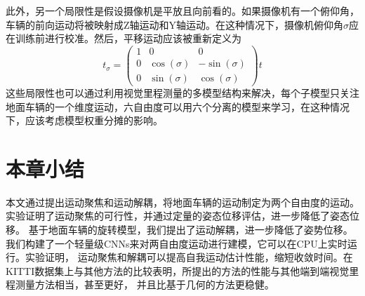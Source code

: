 此外，另一个局限性是假设摄像机是平放且向前看的。如果摄像机有一个俯仰角，车辆的前向运动将被映射成Z轴运动和Y轴运动。在这种情况下，摄像机俯仰角$\sigma$应在训练前进行校准。然后，平移运动应该被重新定义为
\begin{equation}
    t_\sigma = \begin{pmatrix} 1 & 0 & 0 \\ 0 & \cos(\sigma) & -\sin(\sigma)\\ 0 & \sin(\sigma) & \cos(\sigma) \end{pmatrix} t
    \label{eq:pitch_correction}
\end{equation}
这些局限性也可以通过利用视觉里程测量的多模型结构来解决，每个子模型只关注地面车辆的一个维度运动，六自由度可以用六个分离的模型来学习，在这种情况下，应该考虑模型权重分摊的影响。



\section{本章小结}
本文通过提出运动聚焦和运动解耦，将地面车辆的运动制定为两个自由度的运动。实验证明了运动聚焦的可行性，并通过定量的姿态位移评估，进一步降低了姿态位移。
基于地面车辆的旋转模型，我们提出了运动解耦，进一步降低了姿势位移。我们构建了一个轻量级CNNs来对两自由度运动进行建模，它可以在CPU上实时运行。实验证明，
运动聚焦和解耦可以提高自我运动估计性能，缩短收敛时间。在KITTI数据集上与其他方法的比较表明，所提出的方法的性能与其他端到端视觉里程测量方法相当，甚至更好，
并且比基于几何的方法更稳健。

